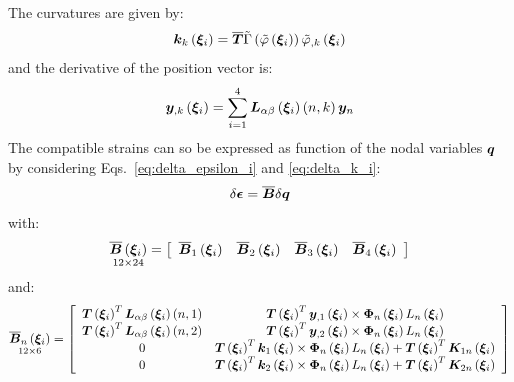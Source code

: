 The curvatures are given by:
\begin{equation}
\T{k}_{k} \valxii  =
\overline{\T{T}} \tilde{\Gamma} \plbr{ \tilde{\varphi} \valxii } \tilde{ \varphi }_{,k} \valxii
\end{equation}
and the derivative of the position vector is:
\begin{equation}
\T{y}_{,k} \valxii  =
\sum_{i=1}^{4} \T{L}_{\alpha \beta} \valxii \plbr{n,k} \T{y}_n
\end{equation}
The compatible strains can so be expressed as function of the nodal variables $\T{q}$ by considering Eqs.~\ref{eq:delta_epsilon_i} and \ref{eq:delta_k_i}:
\begin{equation}
\delta \T{\epsilon} = \overline{\T{B}} \delta{\T{q}}
\end{equation}
with:
\begin{equation}
\underset{ 12 \times 24 }{\overline{\T{B}} \valxii} =
\sqbr{ \matr{ c c c c  }{
\overline{\T{B}}_1 \valxii & \overline{\T{B}}_2 \valxii & \overline{\T{B}}_3 \valxii & \overline{\T{B}}_4 \valxii
}}
\label{eq:B_overline}
\end{equation}
and:
\begin{equation}
\underset{ 12 \times 6 }{\overline{\T{B}}_n \valxii} =
\sqbr{ \matr{ c c  }{
\T{T} \valxii^T \T{L}_{\alpha \beta} \valxii \plbr{n,1} & \T{T}\valxii^T \T{y}_{,1} \valxii \times \T{\Phi}_{n} \valxii L_{n} \valxii \\
\T{T} \valxii^T \T{L}_{\alpha \beta} \valxii \plbr{n,2} & \T{T}\valxii^T \T{y}_{,2} \valxii \times \T{\Phi}_{n} \valxii L_{n} \valxii \\
0 & \T{T}\valxii^T \T{k}_{1} \valxii \times \T{\Phi}_{n} \valxii L_{n} \valxii + \T{T} \valxii^T \T{K}_{1n} \valxii \\
0 & \T{T}\valxii^T \T{k}_{2} \valxii \times \T{\Phi}_{n} \valxii L_{n} \valxii + \T{T} \valxii^T \T{K}_{2n} \valxii
}}
\end{equation}
